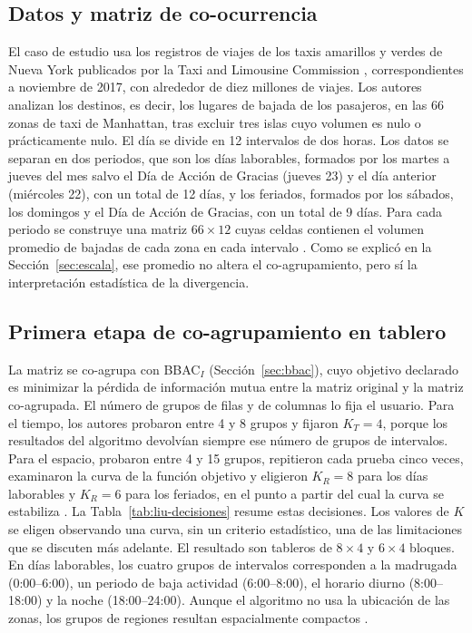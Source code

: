 \subsection{Datos y matriz de co-ocurrencia}

El caso de estudio usa los registros de viajes de los taxis amarillos y verdes de
Nueva York publicados por la Taxi and Limousine Commission \citep{TLC2017},
correspondientes a noviembre de 2017, con alrededor de diez millones de viajes.
Los autores analizan los destinos, es decir, los lugares de bajada de los
pasajeros, en las 66 zonas de taxi de Manhattan, tras excluir tres islas cuyo
volumen es nulo o prácticamente nulo. El día se divide en 12 intervalos de dos
horas. Los datos se separan en dos periodos, que son los días laborables,
formados por los martes a jueves del mes salvo el Día de Acción de Gracias
(jueves 23) y el día anterior (miércoles 22), con un total de 12 días, y los
feriados, formados por los sábados, los domingos y el Día de Acción de Gracias,
con un total de 9 días. Para cada periodo
se construye una matriz $66 \times 12$ cuyas celdas contienen el volumen promedio de bajadas
de cada zona en cada intervalo \citep[Sec.~IV.A]{Liu2021}. Como se explicó en la
Sección~\ref{sec:escala}, ese promedio no altera el co-agrupamiento, pero sí la
interpretación estadística de la divergencia.

\subsection{Primera etapa de co-agrupamiento en tablero}

La matriz se co-agrupa con BBAC$_I$ (Sección~\ref{sec:bbac}), cuyo objetivo
declarado es minimizar la pérdida de información mutua entre la matriz original y
la matriz co-agrupada. El número de grupos de filas y de columnas lo fija el
usuario. Para el tiempo, los autores probaron entre 4 y 8 grupos y fijaron
$K_T = 4$, porque los resultados del algoritmo devolvían siempre ese número de
grupos de intervalos.
Para el espacio, probaron entre 4 y 15 grupos, repitieron cada prueba cinco veces,
examinaron la curva de la función objetivo y eligieron $K_R = 8$ para los días
laborables y $K_R = 6$ para los feriados, en el punto a partir del cual la curva
se estabiliza \citep[Sec.~IV.B]{Liu2021}. La Tabla~\ref{tab:liu-decisiones} resume
estas decisiones. Los valores de $K$ se eligen observando una curva, sin un
criterio estadístico, una de las limitaciones que se discuten más adelante. El
resultado son tableros de $8 \times 4$ y $6 \times 4$ bloques. En días
laborables, los cuatro grupos de intervalos corresponden a la madrugada
(0:00--6:00), un periodo de baja actividad (6:00--8:00), el horario diurno
(8:00--18:00) y la noche (18:00--24:00). Aunque el algoritmo no usa la ubicación de
las zonas, los grupos de regiones resultan espacialmente compactos
\citep[Sec.~IV.C]{Liu2021}.

